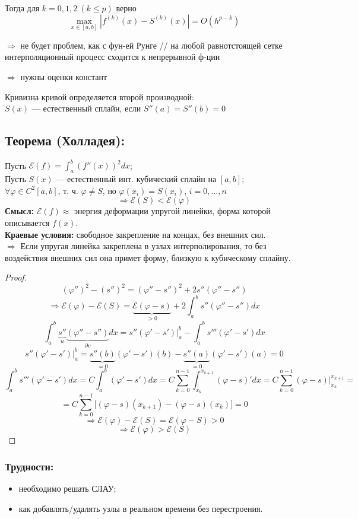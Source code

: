 Тогда для $k = 0, 1, 2 ~ (k \leq p )$ верно
\[
\max_{x \in [a, b]} |f^{(k)}(x) - S^{(k)}(x)| = O(h^{p-k})
\]

$\Rightarrow$ не будет проблем, как с фун-ей Рунге \quad // на любой равнотстоящей сетке интерполяционный процесс сходится к непрерывной ф-ции

$\Rightarrow$ нужны оценки констант

Кривизна кривой определяется второй производной: \\
$S(x)$ --- естественный сплайн, если $S''(a) = S''(b) = 0$

\subsection*{Теорема (Холладея):}
Пусть $\mathcal{E}(f) = \int_a^b \left(f''(x)\right)^2 dx$; \\
Пусть $S(x)$ — естественный инт. кубический сплайн на $[a, b]$; \\
$\forall \varphi \in C^2[a, b]$, т. ч. $\varphi \neq S$, но $\varphi(x_i) = S(x_i)$, $i = 0, \ldots, n$ \\
\[
\Rightarrow \mathcal{E}(S) < \mathcal{E}(\varphi)
\]
\textbf{Смысл:} $\mathcal{E}(f) \approx$ энергия деформации упругой линейки, форма которой описывается $f(x)$. \\
\textbf{Краевые условия:} свободное закрепление на концах, без внешних сил. \\
$\Rightarrow$ Если упругая линейка закреплена в узлах интерполирования, то без воздействия внешних сил она примет форму, близкую к кубическому сплайну.

\begin{proof}
\[
(\varphi'')^2 - (s'')^2 = (\varphi'' - s'')^2 + 2s''(\varphi'' - s'')
\]
\[
\Rightarrow \mathcal{E}(\varphi) - \mathcal{E}(S) =\underbrace{\mathcal{E}(\varphi - s)}_{>0} + 2\int_a^b s''(\varphi'' - s'') dx
\]
\[
\int_a^b \underbrace{s''}_{u} \underbrace{(\varphi'' - s'')}_{\partial v} dx = s''(\varphi' - s') \big|_a^b - \int_a^b s''' (\varphi' - s') dx
\]
\[
s''(\varphi' - s') \big|_a^b = \underbrace{s''(b)}_{=0} (\varphi' - s')(b) - \underbrace{s''(a)}_{=0} (\varphi' - s')(a) = 0
\]
\[
\int_a^b s''' (\varphi' - s') dx = C \int^b_a (\varphi' - s') dx = C \sum_{k=0}^{n-1} \int_{x_k}^{x_{k+1}} (\varphi - s)' dx = C \sum_{k=0}^{n-1} (\varphi - s) \big|_{x_k}^{x_{k+1}}=
\]
\[
= C \sum_{k=0}^{n-1} \big[(\varphi - s)(x_{k+1}) - (\varphi - s)(x_k) \big] = 0
\]
\[
\Rightarrow \mathcal{E}(\varphi) - \mathcal{E}(S) = \mathcal{E}(\varphi - S) > 0
\]
\[
\Rightarrow \mathcal{E}(\varphi) > \mathcal{E}(S)
\]
\end{proof}

\subsubsection*{Трудности:}
\begin{itemize}
    \item необходимо решать СЛАУ;
    \item как добавлять/удалять узлы в реальном времени без перестроения.
\end{itemize}
